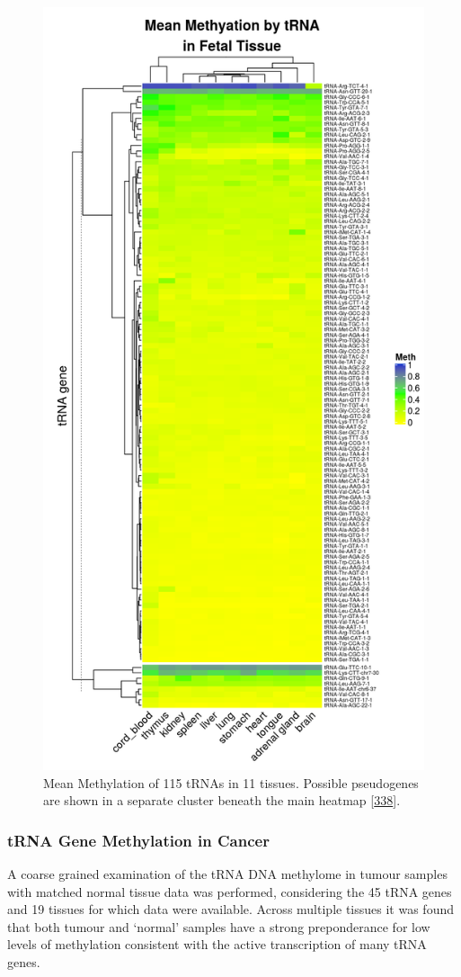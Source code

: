 \documentclass[
]{book}
\begin{document}
\begin{figure}

{\centering \includegraphics[width=0.6\linewidth]{./figs/meanMethBytRNAByFetalTissueHeatmapPseudosplit} 

}

\caption{Mean Methylation of 115 tRNAs in 11 tissues. Possible pseudogenes are shown in a separate cluster beneath the main heatmap {[}\protect\hyperlink{ref-Gu2016}{338}{]}.}\label{fig:meanMethBytRNAByFetalTissueHeatmap}
\end{figure}



\hypertarget{trna-gene-methylation-in-cancer}{%
\subsubsection{tRNA Gene Methylation in Cancer}\label{trna-gene-methylation-in-cancer}}

A coarse grained examination of the tRNA DNA methylome in tumour samples with matched normal tissue data was performed, considering the 45 tRNA genes and 19 tissues for which data were available.
Across multiple tissues it was found that both tumour and `normal' samples have a strong preponderance for low levels of methylation consistent with the active transcription of many tRNA genes.
\end{document}
